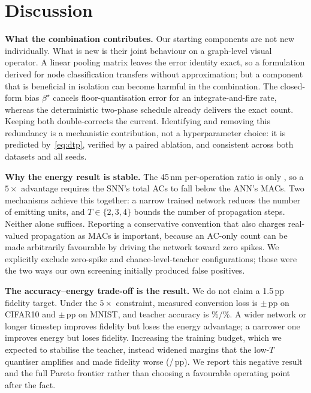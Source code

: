 \section{Discussion}
\label{sec:discussion}

\textbf{What the combination contributes.} Our starting components are not new individually. What is new is their joint behaviour on a graph-level visual operator. A linear pooling matrix leaves the error identity exact, so a formulation derived for node classification transfers without approximation; but a component that is beneficial in isolation can become harmful in the combination. The closed-form bias $\beta^\star$ cancels floor-quantisation error for an integrate-and-fire rate, whereas the deterministic two-phase schedule already delivers the exact count. Keeping both double-corrects the current. Identifying and removing this redundancy is a mechanistic contribution, not a hyperparameter choice: it is predicted by~\eqref{eq:dtp}, verified by a paired ablation, and consistent across both datasets and all seeds.

\textbf{Why the energy result is stable.} The 45\,nm per-operation ratio is only \MACACRatio, so a $5\times$ advantage requires the SNN's total ACs to fall below the ANN's MACs. Two mechanisms achieve this together: a narrow trained network reduces the number of emitting units, and $T\in\{2,3,4\}$ bounds the number of propagation steps. Neither alone suffices. Reporting a conservative convention that also charges real-valued propagation as MACs is important, because an AC-only count can be made arbitrarily favourable by driving the network toward zero spikes. We explicitly exclude zero-spike and chance-level-teacher configurations; those were the two ways our own screening initially produced false positives.

\textbf{The accuracy--energy trade-off is the result.} We do not claim a 1.5\,pp fidelity target. Under the $5\times$ constraint, measured conversion loss is \CIFARLoss$\pm$\CIFARLossStd\,pp on CIFAR10 and \MNISTLoss$\pm$\MNISTLossStd\,pp on MNIST, and teacher accuracy is \CIFARAnn\%/\MNISTAnn\%. A wider network or longer timestep improves fidelity but loses the energy advantage; a narrower one improves energy but loses fidelity. Increasing the training budget, which we expected to stabilise the teacher, instead widened margins that the low-$T$ quantiser amplifies and made fidelity worse (\EIGHTEENMNISTLoss/\EIGHTEENCIFARLoss\,pp). We report this negative result and the full Pareto frontier rather than choosing a favourable operating point after the fact.

